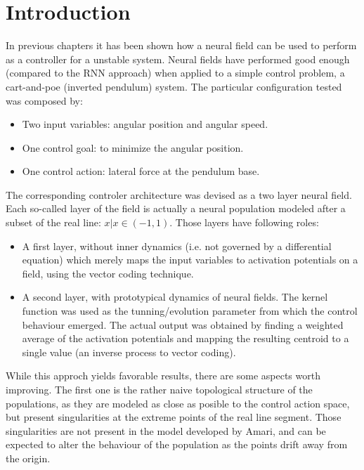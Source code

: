\section{Introduction}
In previous chapters it has been shown how a neural field can be used to perform as a controller for a unstable system. Neural fields have performed good enough (compared to the RNN approach) when applied to a simple control problem, a cart-and-poe (inverted pendulum) system. The particular configuration tested was composed by:

\begin{itemize}
  \item Two input variables: angular position and angular speed.
  \item One control goal: to minimize the angular position.
  \item One control action: lateral force at the pendulum base.
\end{itemize}

The corresponding controler architecture was devised as a two layer neural field. Each so-called layer of the field is actually a neural population modeled after a subset of the real line: $x | x \in (-1,1)$. Those layers have following roles:

\begin{itemize}
  \item A first layer, without inner dynamics (i.e. not governed by a differential equation) which merely maps the input variables to activation potentials on a field, using the vector coding technique.
  \item A second layer, with prototypical dynamics of neural fields. The kernel function was used as the tunning/evolution parameter from which the control behaviour emerged. The actual output was obtained by finding a weighted average of the activation potentials and mapping the resulting centroid to a single value (an inverse process to vector coding).
\end{itemize}

While this approch yields favorable results, there are some aspects worth improving. The first one is the rather naive topological structure of the populations, as they are modeled as close as posible to the control action space, but present singularities at the extreme points of the real line segment. Those singularities are not present in the model developed by Amari, and can be expected to alter the behaviour of the population as the points drift away from the origin. 

